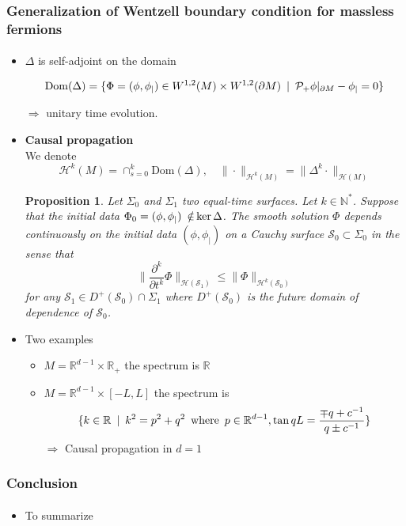 \documentclass[english]{beamer}
\newcommand{\dom}{\mathrm{Dom}}
\newtheorem{proposition}{Proposition}
\begin{document}
\begin{frame}[shrink=30]
\frametitle{\small{Generalization of Wentzell boundary condition for massless fermions}}
\framesubtitle{}

\begin{itemize}

\item<1-> $\Delta$ is self-adjoint on the domain

\begin{equation*}
\dom( \Delta) = \{ \Phi = (\phi, \phi_|) \in W^{1,2}(M)\times W^{1,2}(
\partial M) \enskip | \enskip \mathcal{P}_+\phi \vert_{\partial M} - \phi_| = 0 \} 
\end{equation*}  

$\Rightarrow$ unitary time evolution.
\newline

\item<2-> \textbf{Causal propagation}\\
We denote
\begin{equation*}
\mathcal{H}^k(M) = \cap_{s=0}^{k} \dom(\Delta), 
\quad
\| \cdot \|_{\mathcal{H}^k(M)} = \| \Delta^k \cdot \|_{\mathcal{H}(M)}
\end{equation*}

\begin{proposition}
Let $\Sigma_0$ and $\Sigma_1$ two equal-time surfaces.
Let $k \in \mathbb{N}^*$.
Suppose that the initial data $\Phi_0 = (\phi, \phi_|)\enskip\slashed{\in} \ker \Delta$.
The smooth solution $\Phi$ depends continuously on the initial data $(\phi, \phi_|)$ on a Cauchy surface $\mathcal{S}_0 \subset \Sigma_0$ in the sense that
\begin{equation*}
\big\| \frac{\partial^k}{\partial t^k} \Phi\big\|_{\mathcal{H}(\mathcal{S}_1)}
\leq
\big\| \Phi\big\|_{\mathcal{H}^{k}(\mathcal{S}_0)}
\end{equation*}
for any $\mathcal{S}_1 \in D^+(\mathcal{S}_0)\cap\Sigma_1$
where $D^+(\mathcal{S}_0)$ is the future domain of dependence of $\mathcal{S}_0$.
\end{proposition}

\item<3-> Two examples 

	\begin{itemize}
		\item<4-> $M = \mathbb{R}^{d-1}\times \mathbb{R}_+$ the spectrum is $\mathbb{R}$
		\item<5-> $M = \mathbb{R}^{d-1}\times [-L, L]$ the spectrum is
		\begin{equation*}
		\{k\in\mathbb{R} \enskip\vert\enskip k^2 = p^2 + q^2 \enskip\mathrm{ where }\enskip p\in\mathbb{R}^{d-1}, \tan q L = \frac{\mp q + c^{-1}}{q \pm c^{-1}}\}
		\end{equation*}
		$\Rightarrow$ Causal propagation in $d=1$
	\end{itemize}
\end{itemize}

\end{frame}
\begin{frame}[shrink=30]
\frametitle{Conclusion}
\framesubtitle{}

\begin{itemize}
\item To summarize
\end{itemize}
\end{frame}
\end{document}
